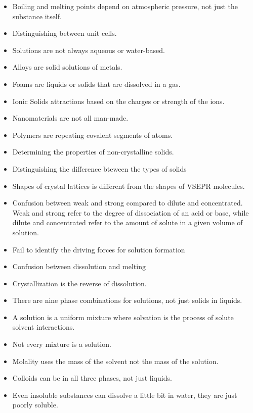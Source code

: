 \begin{itemize}
                \item Boiling and melting points depend on atmospheric pressure, not just the substance itself.
                \item Distinguishing between unit cells.
                \item Solutions are not always aqueous or water-based.
                \item Alloys are solid solutions of metals.
                \item Foams are liquids or solids that are dissolved in a gas.
                \item Ionic Solids attractions based on the charges or strength of the ions.
                \item Nanomaterials are not all man-made.
                \item Polymers are repeating covalent segments of atoms.
                \item Determining the properties of non-crystalline solids.
                \item Distinguishing the difference bteween the types of solids
                \item Shapes of crystal lattices is different from the shapes of VSEPR molecules. 
                \item Confusion between weak and strong compared to dilute and concentrated. Weak and strong refer to the degree of dissociation of an acid or base, while dilute and concentrated refer to the amount of solute in a given volume of solution.
                \item Fail to identify the driving forces for solution formation
                \item Confusion between dissolution and melting
                \item Crystallization is the reverse of dissolution. 
                \item There are nine phase combinations for solutions, not just solids in liquids. 
                \item A solution is a uniform mixture where solvation is the process of solute solvent interactions.
                \item Not every mixture is a solution.
                \item Molality uses the mass of the solvent not the mass of the solution.
                \item Colloids can be in all three phases, not just liquids.
                \item Even insoluble substances can dissolve a little bit in water, they are just poorly soluble.
            \end{itemize}